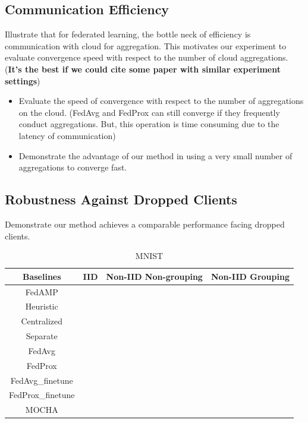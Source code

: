 {\subsection{Communication Efficiency}
Illustrate that for federated learning, the bottle neck of efficiency is communication with cloud for aggregation. This motivates our experiment to evaluate convergence speed with respect to the number of cloud aggregations. (\textbf{It's the best if we could cite some paper with similar experiment settings})
\begin{itemize}
    \item Evaluate the speed of convergence with respect to the number of aggregations on the cloud. (FedAvg and FedProx can still converge if they frequently conduct aggregations. But, this operation is time consuming due to the latency of communication)
    \item Demonstrate the advantage of our method in using a very small number of aggregations to converge fast.
\end{itemize}

\subsection{Robustness Against Dropped Clients}
Demonstrate our method achieves a comparable performance facing dropped clients.

\begin{table}[h!]
\centering
\begin{tabular}{ |c|c c c| } 
 \hline
 Baselines & IID & Non-IID Non-grouping & Non-IID Grouping \\ 
 \hline
 FedAMP &  &  &  \\ 
 Heuristic &  &  & \\ 
 Centralized &  &  & \\
 Separate &  &  & \\
 FedAvg &  &  & \\
 FedProx &  &  & \\
 FedAvg\_finetune &  &  & \\
 FedProx\_finetune &  &  & \\
 MOCHA &  &  & \\
 \hline
\end{tabular}
\caption{MNIST}
\end{table}

}
